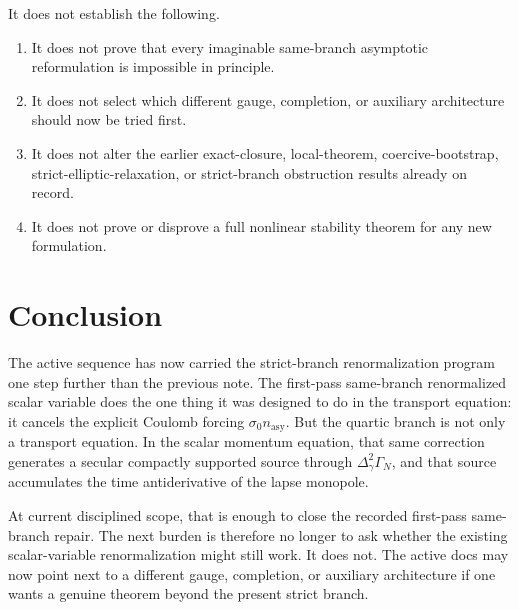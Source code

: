 \documentclass[11pt]{article}
\begin{document}
It does not establish the following.
\begin{enumerate}
    \item It does not prove that every imaginable same-branch asymptotic reformulation is impossible in principle.
    \item It does not select which different gauge, completion, or auxiliary architecture should now be tried first.
    \item It does not alter the earlier exact-closure, local-theorem, coercive-bootstrap, strict-elliptic-relaxation, or strict-branch obstruction results already on record.
    \item It does not prove or disprove a full nonlinear stability theorem for any new formulation.
\end{enumerate}

\section{Conclusion}

The active sequence has now carried the strict-branch renormalization program one step further than the previous note. The first-pass same-branch renormalized scalar variable does the one thing it was designed to do in the transport equation: it cancels the explicit Coulomb forcing \(\sigma_0 n_{\mathrm{asy}}\). But the quartic branch is not only a transport equation. In the scalar momentum equation, that same correction generates a secular compactly supported source through \(\Delta_\gamma^2\Gamma_N\), and that source accumulates the time antiderivative of the lapse monopole.

At current disciplined scope, that is enough to close the recorded first-pass same-branch repair. The next burden is therefore no longer to ask whether the existing scalar-variable renormalization might still work. It does not. The active docs may now point next to a different gauge, completion, or auxiliary architecture if one wants a genuine theorem beyond the present strict branch.
\end{document}
